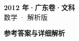 \documentclass[zihao=-4, a4paper]{ctexart}
\begin{document}
\begin{center}
  {\Large\bfseries 2012 年·广东卷·文科}\\[4pt]
  {\large 数学 · 解析版}
\end{center}
\medskip
{}

\clearpage
{}
\begin{center}{\Large\bfseries 参考答案与详细解析}\end{center}
\medskip

\end{document}
